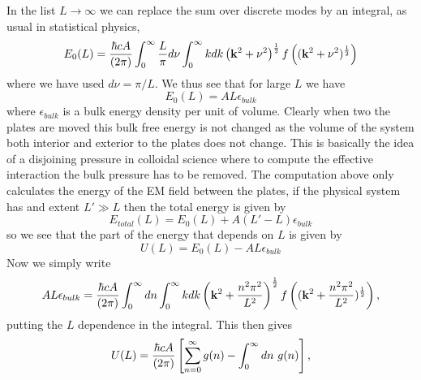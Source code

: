 In the list $L\to\infty$ we can replace the sum over discrete modes by an integral, as usual in statistical physics, 
\begin{equation}
E_0(L) = {\hbar c A\over (2\pi)}\int_{0}^\infty  {L\over \pi}d\nu \int_0^\infty   kdk \left({\bf k}^2 + \nu^2\right)^{1\over 2}f\left(({\bf k}^2 + \nu^2)^{1\over 2}\right)
\end{equation}
where we have used $d\nu = \pi/L$. We thus see that for large $L$ we have
\begin{equation}
E_0(L) = AL \epsilon_{bulk}
\end{equation}
where $\epsilon_{bulk}$ is a bulk energy density per unit of volume. Clearly when two the plates are moved this bulk free energy is not changed as the volume of the system both
interior and exterior to the plates does not change. This is basically the idea of a disjoining pressure in colloidal science where to compute the effective interaction the bulk pressure has to be removed. The computation above only calculates the energy of the EM field between the plates, if the physical system has and extent $L'\gg L$ then the total energy is
given by
\begin{equation}
E_{total}(L) = E_0(L) + A(L'-L)\epsilon_{bulk}
\end{equation}
so we see that the part of the energy that depends on $L$ is given by
\begin{equation}
U(L) = E_0(L)- AL\epsilon_{bulk}
\end{equation}
Now we simply write 
\begin{equation}
AL\epsilon_{bulk} = {\hbar c A\over (2\pi)}\int_{0}^\infty  dn \int_0^\infty   kdk \left({\bf k}^2 + {n^2\pi^2\over L^2}\right)^{1\over 2} f\left(({\bf k}^2 + {n^2\pi^2\over L^2})^{1\over 2}\right),
\end{equation}
putting the $L$ dependence in the integral. This then gives
\begin{equation}
U(L) = {\hbar c A\over (2\pi)}\left[\sum_{n=0}^\infty g(n) -\int_0^\infty dn \ g(n)\right],
\end{equation}
 
